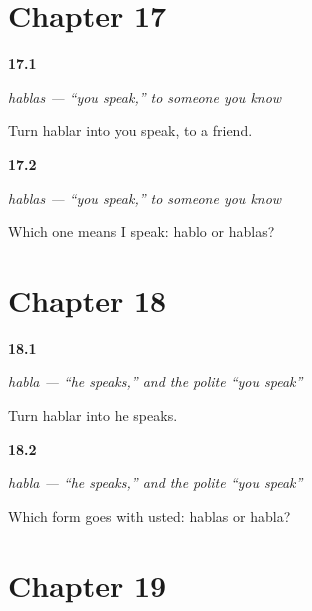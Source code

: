 \section*{Chapter 17}

\noindent\begin{minipage}[t]{\linewidth}
\raggedright
\hypertarget{review-ES-C06-hablas-form}{\textbf{17.1}} \emph{hablas — \textquotedblleft{}you speak,\textquotedblright{} to someone you know}\par
\small Turn hablar into you speak, to a friend.
\end{minipage}\par\medskip

\noindent\begin{minipage}[t]{\linewidth}
\raggedright
\hypertarget{review-ES-C06-hablas-contrast}{\textbf{17.2}} \emph{hablas — \textquotedblleft{}you speak,\textquotedblright{} to someone you know}\par
\small Which one means I speak: hablo or hablas?
\end{minipage}\par\medskip

\section*{Chapter 18}

\noindent\begin{minipage}[t]{\linewidth}
\raggedright
\hypertarget{review-ES-C06-habla-form}{\textbf{18.1}} \emph{habla — \textquotedblleft{}he speaks,\textquotedblright{} and the polite \textquotedblleft{}you speak\textquotedblright{}}\par
\small Turn hablar into he speaks.
\end{minipage}\par\medskip

\noindent\begin{minipage}[t]{\linewidth}
\raggedright
\hypertarget{review-ES-C06-habla-usted}{\textbf{18.2}} \emph{habla — \textquotedblleft{}he speaks,\textquotedblright{} and the polite \textquotedblleft{}you speak\textquotedblright{}}\par
\small Which form goes with usted: hablas or habla?
\end{minipage}\par\medskip

\section*{Chapter 19}

